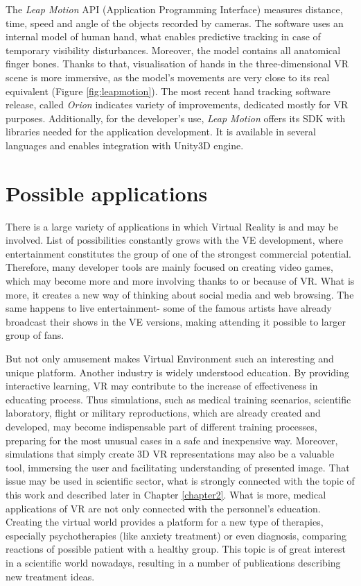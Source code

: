 The \textit{Leap Motion} API (Application Programming Interface) measures distance, time, speed and angle of the objects recorded by cameras. The software uses an internal model of human hand, what enables predictive tracking in case of temporary visibility disturbances. Moreover, the model contains all anatomical finger bones. Thanks to that, visualisation of hands in the three-dimensional VR scene is more immersive, as the model's movements are very close to its real equivalent (Figure \ref{fig:leapmotion}).
The most recent hand tracking software release, called \textit{Orion} indicates variety of improvements, dedicated mostly for VR purposes. Additionally, for the developer's use, \textit{Leap Motion} offers its SDK with libraries needed for the application development. It is available in several languages and enables integration with Unity3D engine.

\section{Possible applications}%
There is a large variety of applications in which Virtual Reality is and may be involved. List of possibilities constantly grows with the VE development, where entertainment constitutes the group of one of the strongest commercial potential. Therefore, many developer tools are mainly focused on creating video games, which may become more and more involving thanks to or because of VR. What is more, it creates a new way of thinking about social media and web browsing. The same happens to live entertainment- some of the famous artists have already broadcast their shows in the VE versions, making attending it possible to larger group of fans. 

But not only amusement makes Virtual Environment such an interesting and unique platform. Another industry is widely understood education. By providing interactive learning, VR may contribute to the increase of effectiveness in educating process. Thus simulations, such as medical training scenarios, scientific laboratory, flight or military reproductions, which are already created and developed, may become indispensable part of different training processes, preparing for the most unusual cases in a safe and inexpensive way. Moreover, simulations that simply create 3D VR representations may also be a valuable tool, immersing the user and facilitating understanding of presented image. That issue may be used in scientific sector, what is strongly connected with the topic of this work and described later in Chapter \ref{chapter2}. What is more, medical applications of VR are not only connected with the personnel's education. Creating the virtual world provides a platform for a new type of therapies, especially psychotherapies (like anxiety treatment) or even diagnosis, comparing reactions of possible patient with a healthy group. This topic is of great interest in a scientific world nowadays, resulting in a number of publications describing new treatment ideas.

